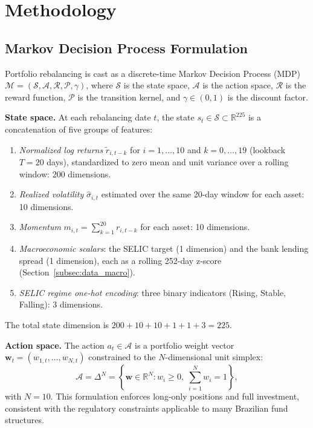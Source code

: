 \section{Methodology}
\label{sec:methodology}

\subsection{Markov Decision Process Formulation}
\label{subsec:mdp}

Portfolio rebalancing is cast as a discrete-time Markov Decision Process (MDP)
$\mathcal{M} = (\mathcal{S}, \mathcal{A}, \mathcal{R}, \mathcal{P}, \gamma)$,
where $\mathcal{S}$ is the state space, $\mathcal{A}$ is the action space,
$\mathcal{R}$ is the reward function, $\mathcal{P}$ is the transition kernel, and
$\gamma \in (0,1)$ is the discount factor.

\textbf{State space.}
At each rebalancing date $t$, the state $s_t \in \mathcal{S} \subset \mathbb{R}^{225}$
is a concatenation of five groups of features:
\begin{enumerate}
  \item \emph{Normalized log returns} $\tilde{r}_{i,t-k}$ for $i = 1,\dots,10$
        and $k = 0,\dots,19$ (lookback $T = 20$ days), standardized to zero mean
        and unit variance over a rolling window: 200 dimensions.
  \item \emph{Realized volatility} $\hat{\sigma}_{i,t}$ estimated over the same
        20-day window for each asset: 10 dimensions.
  \item \emph{Momentum} $m_{i,t} = \sum_{k=1}^{20} r_{i,t-k}$ for each asset:
        10 dimensions.
  \item \emph{Macroeconomic scalars}: the SELIC target (1 dimension) and the
        bank lending spread (1 dimension), each as a rolling 252-day z-score
        (Section~\ref{subsec:data_macro}).
  \item \emph{SELIC regime one-hot encoding}: three binary indicators
        (Rising, Stable, Falling): 3 dimensions.
\end{enumerate}
The total state dimension is $200 + 10 + 10 + 1 + 1 + 3 = 225$.

\textbf{Action space.}
The action $a_t \in \mathcal{A}$ is a portfolio weight vector
$\mathbf{w}_t = (w_{1,t}, \dots, w_{N,t})$ constrained to the $N$-dimensional
unit simplex:
\begin{equation}
  \mathcal{A} = \Delta^N = \left\{ \mathbf{w} \in \mathbb{R}^N : w_i \geq 0,\;
  \sum_{i=1}^N w_i = 1 \right\},
  \label{eq:action_space}
\end{equation}
with $N = 10$.
This formulation enforces long-only positions and full investment, consistent with
the regulatory constraints applicable to many Brazilian fund structures.

